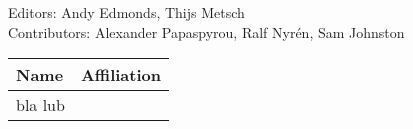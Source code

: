 Editors: Andy Edmonds, Thijs Metsch \\
Contributors: Alexander Papaspyrou, Ralf Nyr\'en, Sam Johnston

\begin{tabular}{l|p{12cm}}
Name & Affiliation \\
\hline
bla lub \\
\end{tabular}
